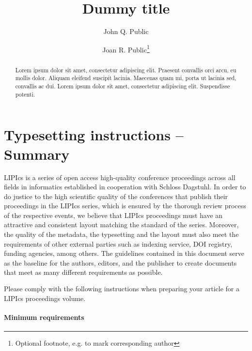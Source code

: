 \documentclass[a4paper,UKenglish,cleveref, autoref, thm-restate]{lipics-v2021}
\title{Dummy title} %
\author{John Q. Public}{Dummy University Computing Laboratory, [optional: Address], Country \and My second affiliation, Country \and \url{http://www.myhomepage.edu} }{johnqpublic@dummyuni.org}{https://orcid.org/0000-0002-1825-0097}{(Optional) author-specific funding acknowledgements}%
\author{Joan R. Public\footnote{Optional footnote, e.g. to mark corresponding author}}{Department of Informatics, Dummy College, [optional: Address], Country}{joanrpublic@dummycollege.org}{[orcid]}{[funding]}
\begin{document}
\maketitle

\begin{abstract}
Lorem ipsum dolor sit amet, consectetur adipiscing elit. Praesent convallis orci arcu, eu mollis dolor. Aliquam eleifend suscipit lacinia. Maecenas quam mi, porta ut lacinia sed, convallis ac dui. Lorem ipsum dolor sit amet, consectetur adipiscing elit. Suspendisse potenti. 
\end{abstract}

\section{Typesetting instructions -- Summary}
\label{sec:typesetting-summary}


LIPIcs is a series of open access high-quality conference proceedings across all fields in informatics established in cooperation with Schloss Dagstuhl. 
In order to do justice to the high scientific quality of the conferences that publish their proceedings in the LIPIcs series, which is ensured by the thorough review process of the respective events, we believe that LIPIcs proceedings must have an attractive and consistent layout matching the standard of the series.
Moreover, the quality of the metadata, the typesetting and the layout must also meet the requirements of other external parties such as indexing service, DOI registry, funding agencies, among others. The guidelines contained in this document serve as the baseline for the authors, editors, and the publisher to create documents that meet as many different requirements as possible. 

Please comply with the following instructions when preparing your article for a LIPIcs proceedings volume. 
\paragraph*{Minimum requirements}
\end{document}
